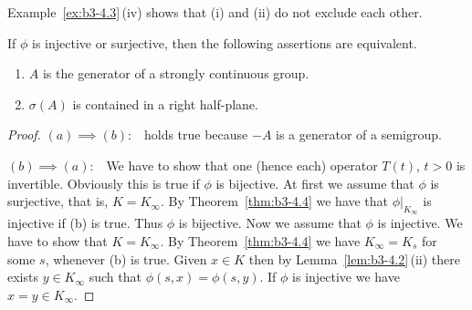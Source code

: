 Example~\ref{ex:b3-4.3}\,(iv) shows that (i) and (ii) do not exclude each other.
\begin{corollary}\label{cor:b3-4.5}
	If\/ $\phi$ is injective or surjective, then the following assertions are equivalent.
	\begin{enumerate}[\upshape (a)]
		\item 
		$A$ is the generator of a strongly continuous group.
		
		\item 
		$\sigma(A)$ is contained in a right half-plane.
	\end{enumerate}
\end{corollary}
\begin{proof}
	$(a)\implies(b)$:\ \  holds true because $-A$ is a generator of a semigroup.
	
	$(b)\implies(a)$:\ \ 
	We have to show that one (hence each) operator $T(t)$, $t > 0$ is invertible.
	Obviously this is true if\/ $\phi$ is bijective.
	At first we assume that $\phi$ is surjective, that is, $K = K_{\infty}$.
	By Theorem~\ref{thm:b3-4.4} we have that $\phi|_{K_{\infty}}$ is injective if (b) is true.
	Thus $\phi$ is bijective.
	Now we assume that $\phi$ is injective.
	We have to show that $K = K_{\infty}$.
	By Theorem~\ref{thm:b3-4.4} we have $K_{\infty} = K_{s}$ for some $s$, whenever (b) is true.
	Given $x \in K$ then by Lemma~\ref{lem:b3-4.2}\,(ii) there exists $y \in K_{\infty}$ such that $\phi(s,x) = \phi(s,y)$.
	If\/ $\phi$ is injective we have $x = y \in K_{\infty}$.
\end{proof}
